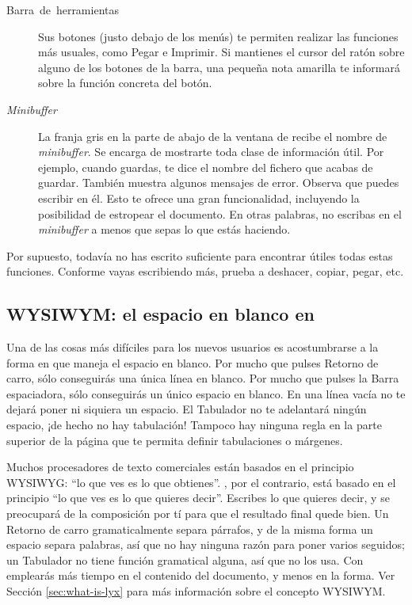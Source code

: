 \begin{description}
\item [Barra~de~herramientas]Sus botones (justo debajo de los menús)
te permiten realizar las funciones más usuales, como \textsf{Pegar}
e \textsf{Imprimir}. Si mantienes el cursor del ratón sobre alguno
de los botones de la barra, una pequeña nota amarilla te informará
sobre la función concreta del botón.
\item [\emph{Minibuffer}]La franja gris en la parte de abajo de la ventana
de \LyX{} recibe el nombre de \emph{minibuffer}. Se encarga de mostrarte
toda clase de información útil. Por ejemplo, cuando guardas, te dice
el nombre del fichero que acabas de guardar. También muestra algunos
mensajes de error. Observa que puedes escribir en él. Esto te ofrece
una gran funcionalidad, incluyendo la posibilidad de estropear el
documento. En otras palabras, no escribas en el \emph{minibuffer}
a menos que sepas lo que estás haciendo.
\end{description}
Por supuesto, todavía no has escrito suficiente para encontrar útiles
todas estas funciones. Conforme vayas escribiendo más, prueba a deshacer,
copiar, pegar, etc.


\subsection{WYSIWYM: el espacio en blanco en \LyX{}}

\label{sec:whitespace}Una de las cosas más difíciles para los nuevos
usuarios es acostumbrarse a la forma en que \LyX{} maneja el espacio
en blanco. Por mucho que pulses \textsf{Retorno de carro}, sólo conseguirás
una única línea en blanco. Por mucho que pulses la \textsf{Barra espaciadora},
sólo conseguirás un único espacio en blanco. En una línea vacía \LyX{}
no te dejará poner ni siquiera un espacio. El \textsf{Tabulador} no
te adelantará ningún espacio, ¡de hecho no hay tabulación! Tampoco
hay ninguna regla en la parte superior de la página que te permita
definir tabulaciones o márgenes.

Muchos procesadores de texto comerciales están basados en el principio
WYSIWYG: {}``lo que ves es lo que obtienes''. \LyX{}, por el contrario,
está basado en el principio {}``lo que ves es lo que quieres decir''.
Escribes lo que quieres decir, y \LyX{} se preocupará de la composición
por tí para que el resultado final quede bien. Un \textsf{Retorno
de carro} gramaticalmente separa párrafos, y de la misma forma un
\textsf{espacio} separa palabras, así que no hay ninguna razón para
poner varios seguidos; un \textsf{Tabulador} no tiene función gramatical
alguna, así que \LyX{} no los usa. Con \LyX{} emplearás más tiempo
en el contenido del documento, y menos en la forma. Ver Sección \ref{sec:what-is-lyx}
para más información sobre el concepto WYSIWYM.

